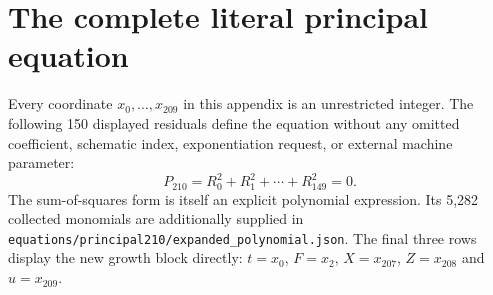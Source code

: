\documentclass[11pt,a4paper]{article}
\theoremstyle{remark}\newtheorem{remark}[theorem]{Remark}
\begin{document}
\section{The complete literal principal equation}\label{app:literal}

Every coordinate $x_0,\ldots,x_{209}$ in this appendix is an unrestricted
integer. The following 150 displayed residuals define the equation without
any omitted coefficient, schematic index, exponentiation request, or external
machine parameter:
\[
\boxed{\ P_{210}=R_0^2+R_1^2+\cdots+R_{149}^2=0.\ }
\]
The sum-of-squares form is itself an explicit polynomial expression. Its
5,282 collected monomials are additionally supplied in
\texttt{equations/principal210/expanded\_polynomial.json}.
The final three rows display the new growth block directly: $t=x_0$,
$F=x_2$, $X=x_{207}$, $Z=x_{208}$ and $u=x_{209}$.

\begingroup\small

\endgroup
\end{document}
